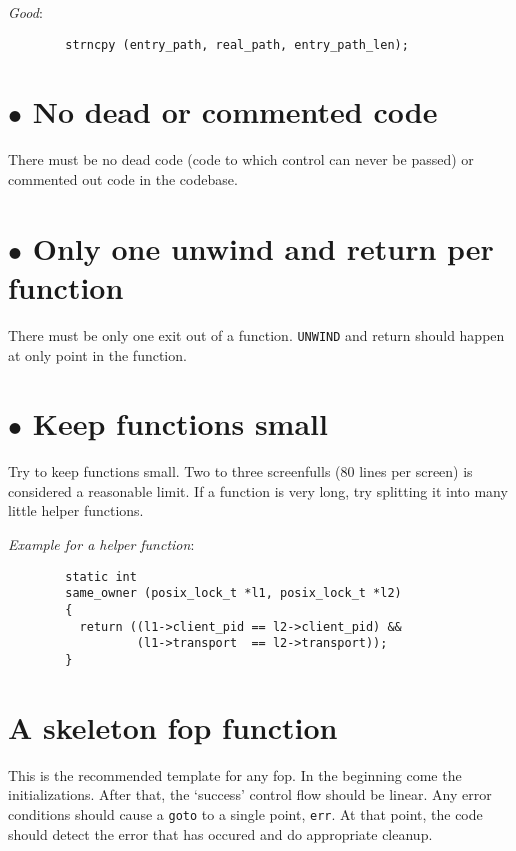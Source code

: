 \documentclass{article}[12pt]
\begin{document}
\textsl{Good}:

\begin{verbatim}
        strncpy (entry_path, real_path, entry_path_len);
\end{verbatim}

\section*{$\bullet$ No dead or commented code}
There must be no dead code (code to which control can never be passed) or 
commented out code in the codebase.

\section*{$\bullet$ Only one unwind and return per function}
There must be only one exit out of a function. \texttt{UNWIND} and return 
should happen at only point in the function.

\section*{$\bullet$ Keep functions small}
Try to keep functions small. Two to three screenfulls (80 lines per screen) is
considered a reasonable limit. If a function is very long, try splitting it
into many little helper functions.

\vspace{2ex}
\textsl{Example for a helper function}:
\begin{verbatim}
        static int
        same_owner (posix_lock_t *l1, posix_lock_t *l2)
        {
          return ((l1->client_pid == l2->client_pid) &&
                  (l1->transport  == l2->transport));
        }
\end{verbatim}

\section*{A skeleton fop function}
This is the recommended template for any fop. In the beginning come the
initializations. After that, the `success' control flow should be linear. 
Any error conditions should cause a \texttt{goto} to a single point, \texttt{err}.
At that point, the code should detect the error that has occured and do
appropriate cleanup.
\end{document}
